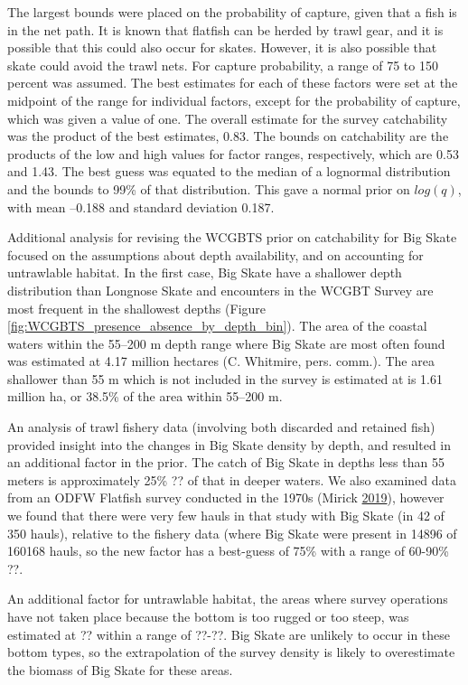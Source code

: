 \documentclass[12pt,]{article}
\begin{document}
The largest bounds were placed on the probability of capture, given that
a fish is in the net path. It is known that flatfish can be herded by
trawl gear, and it is possible that this could also occur for skates.
However, it is also possible that skate could avoid the trawl nets. For
capture probability, a range of 75 to 150 percent was assumed. The best
estimates for each of these factors were set at the midpoint of the
range for individual factors, except for the probability of capture,
which was given a value of one. The overall estimate for the survey
catchability was the product of the best estimates, 0.83. The bounds on
catchability are the products of the low and high values for factor
ranges, respectively, which are 0.53 and 1.43. The best guess was
equated to the median of a lognormal distribution and the bounds to 99\%
of that distribution. This gave a normal prior on \(log(q)\), with mean
--0.188 and standard deviation 0.187.

Additional analysis for revising the WCGBTS prior on catchability for
Big Skate focused on the assumptions about depth availability, and on
accounting for untrawlable habitat. In the first case, Big Skate have a
shallower depth distribution than Longnose Skate and encounters in the
WCGBT Survey are most frequent in the shallowest depths (Figure
\ref{fig:WCGBTS_presence_absence_by_depth_bin}). The area of the coastal
waters within the 55--200 m depth range where Big Skate are most often
found was estimated at 4.17 million hectares (C. Whitmire, pers. comm.).
The area shallower than 55 m which is not included in the survey is
estimated at is 1.61 million ha, or 38.5\% of the area within 55--200 m.

An analysis of trawl fishery data (involving both discarded and retained
fish) provided insight into the changes in Big Skate density by depth,
and resulted in an additional factor in the prior. The catch of Big
Skate in depths less than 55 meters is approximately 25\% ?? of that in
deeper waters. We also examined data from an ODFW Flatfish survey
conducted in the 1970s (Mirick
\protect\hyperlink{ref-Mirick2019}{2019}), however we found that there
were very few hauls in that study with Big Skate (in 42 of 350 hauls),
relative to the fishery data (where Big Skate were present in 14896 of
160168 hauls, so the new factor has a best-guess of 75\% with a range of
60-90\% ??.

An additional factor for untrawlable habitat, the areas where survey
operations have not taken place because the bottom is too rugged or too
steep, was estimated at ?? within a range of ??-??. Big Skate are
unlikely to occur in these bottom types, so the extrapolation of the
survey density is likely to overestimate the biomass of Big Skate for
these areas.
\end{document}
